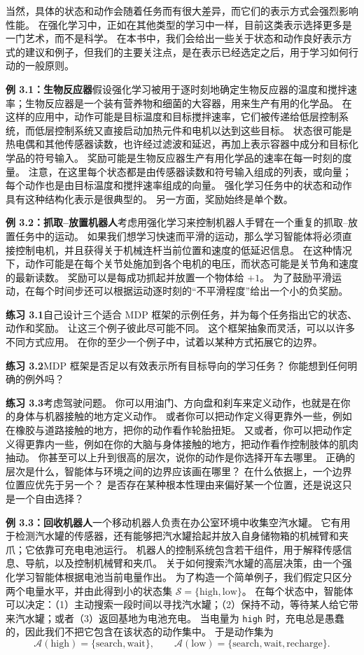 \documentclass[UTF8, 12pt, fontset=fandol, oneside]{ctexart}
\begin{document}
当然，具体的状态和动作会随着任务而有很大差异，而它们的表示方式会强烈影响性能。
在强化学习中，正如在其他类型的学习中一样，目前这类表示选择更多是一门艺术，而不是科学。
在本书中，我们会给出一些关于状态和动作良好表示方式的建议和例子，但我们的主要关注点，是在表示已经选定之后，用于学习如何行动的一般原则。

\noindent\textbf{例 3.1：生物反应器}\quad 假设强化学习被用于逐时刻地确定生物反应器的温度和搅拌速率；生物反应器是一个装有营养物和细菌的大容器，用来生产有用的化学品。
在这样的应用中，动作可能是目标温度和目标搅拌速率，它们被传递给低层控制系统，而低层控制系统又直接启动加热元件和电机以达到这些目标。
状态很可能是热电偶和其他传感器读数，也许经过滤波和延迟，再加上表示容器中成分和目标化学品的符号输入。
奖励可能是生物反应器生产有用化学品的速率在每一时刻的度量。
注意，在这里每个状态都是由传感器读数和符号输入组成的列表，或向量；每个动作也是由目标温度和搅拌速率组成的向量。
强化学习任务中的状态和动作具有这种结构化表示是很典型的。
另一方面，奖励始终是单个数。

\noindent\textbf{例 3.2：抓取--放置机器人}\quad 考虑用强化学习来控制机器人手臂在一个重复的抓取--放置任务中的运动。
如果我们想学习快速而平滑的运动，那么学习智能体将必须直接控制电机，并且获得关于机械连杆当前位置和速度的低延迟信息。
在这种情况下，动作可能是在每个关节处施加到各个电机的电压，而状态可能是关节角和速度的最新读数。
奖励可以是每成功抓起并放置一个物体给 $+1$。
为了鼓励平滑运动，在每个时间步还可以根据运动逐时刻的“不平滑程度”给出一个小的负奖励。

\noindent\textbf{练习 3.1}\quad 自己设计三个适合 MDP 框架的示例任务，并为每个任务指出它的状态、动作和奖励。
让这三个例子彼此尽可能不同。
这个框架抽象而灵活，可以以许多不同方式应用。
在你的至少一个例子中，试着以某种方式拓展它的边界。

\noindent\textbf{练习 3.2}\quad MDP 框架是否足以有效表示所有目标导向的学习任务？
你能想到任何明确的例外吗？

\noindent\textbf{练习 3.3}\quad 考虑驾驶问题。
你可以用油门、方向盘和刹车来定义动作，也就是在你的身体与机器接触的地方定义动作。
或者你可以把动作定义得更靠外一些，例如在橡胶与道路接触的地方，把你的动作看作轮胎扭矩。
又或者，你可以把动作定义得更靠内一些，例如在你的大脑与身体接触的地方，把动作看作控制肢体的肌肉抽动。
你甚至可以上升到很高的层次，说你的动作是你选择开车去哪里。
正确的层次是什么，智能体与环境之间的边界应该画在哪里？
在什么依据上，一个边界位置应优先于另一个？
是否存在某种根本性理由来偏好某一个位置，还是说这只是一个自由选择？

\noindent\textbf{例 3.3：回收机器人}\quad 一个移动机器人负责在办公室环境中收集空汽水罐。
它有用于检测汽水罐的传感器，还有能够把汽水罐拾起并放入自身储物箱的机械臂和夹爪；它依靠可充电电池运行。
机器人的控制系统包含若干组件，用于解释传感信息、导航，以及控制机械臂和夹爪。
关于如何搜索汽水罐的高层决策，由一个强化学习智能体根据电池当前电量作出。
为了构造一个简单例子，我们假定只区分两个电量水平，并由此得到小的状态集 $\mathcal{S}=\{\text{high},\text{low}\}$。
在每个状态中，智能体可以决定：（1）主动搜索一段时间以寻找汽水罐；（2）保持不动，等待某人给它带来汽水罐；或者（3）返回基地为电池充电。
当电量为 \texttt{high} 时，充电总是愚蠢的，因此我们不把它包含在该状态的动作集中。
于是动作集为
\[
\mathcal{A}(\text{high})=\{\text{search},\text{wait}\},\qquad
\mathcal{A}(\text{low})=\{\text{search},\text{wait},\text{recharge}\}.
\]
\end{document}
